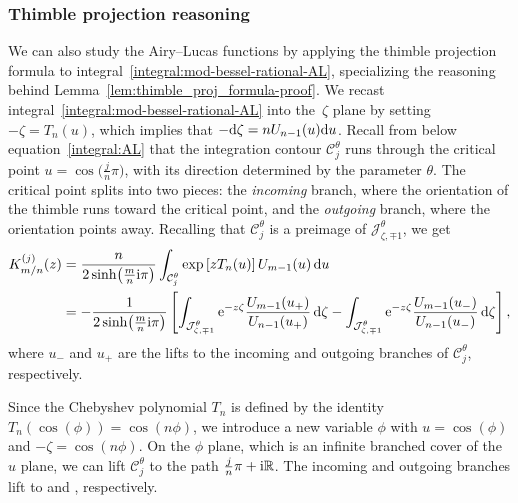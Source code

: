 \documentclass[pdftex]{sigma}
\newcommand{\R}{\mathbb{R}}
\numberwithin{equation}{section}
\begin{document}
\subsubsection{Thimble projection reasoning}\label{contour-argument-AL}
We can also study the Airy--Lucas functions by applying the thimble projection formula to integral~\eqref{integral:mod-bessel-rational-AL}, specializing the reasoning behind Lemma~\ref{lem:thimble_proj_formula-proof}. We recast integral~\eqref{integral:mod-bessel-rational-AL} into the~$\zeta$ plane by setting $-\zeta = T_n(u)$, which implies that $-{\rm d}\zeta = n U_{n-1}(u) {\rm d}u$. Recall from below equation~\eqref{integral:AL} that the integration contour $\mathcal{C}^\theta_j$ runs through the critical point $u = \cos\bigl(\frac{j}{n}\pi\bigr)$, with its direction determined by the parameter $\theta$. The critical point splits  into two pieces: the {\em incoming} branch, where the orientation of the thimble runs toward the critical point, and the {\em outgoing} branch, where the orientation points away. Recalling that $\mathcal{C}^\theta_j$ is a preimage of $\mathcal{J}^\theta_{\zeta, \mp 1}$, we get
\begin{align*}
K^{(j)}_{m/n}(z) & = \frac{n}{2 \sinh\bigl(\frac{m}{n} {\rm i}\pi\bigr)} \int_{\mathcal{C}^\theta_j} \exp\left[z T_n(u)\right] U_{m-1}(u) \,{\rm d}u \\
& = -\frac{1}{2\sinh\bigl(\frac{m}{n} {\rm i}\pi\bigr)} \left[ \int_{\mathcal{J}^\theta_{\zeta, \mp 1}} {\rm e}^{-z\zeta} \frac{U_{m-1}(u_+)}{U_{n-1}(u_+)} \,{\rm d}\zeta - \int_{\mathcal{J}^\theta_{\zeta, \mp 1}} {\rm e}^{-z\zeta} \frac{U_{m-1}(u_-)}{U_{n-1}(u_-)} \,{\rm d}\zeta \right],
\end{align*}
where $u_-$ and $u_+$ are the lifts to the incoming and outgoing branches of $\mathcal{C}^\theta_j$, respectively.

Since the Chebyshev polynomial $T_n$ is defined by the identity $T_n(\cos(\phi)) = \cos(n\phi)$, we introduce a new variable $\phi$ with $u = \cos(\phi)$ and $-\zeta = \cos(n\phi)$. On the $\phi$ plane, which is an infinite branched cover of the $u$ plane, we can lift $\mathcal{C}^\theta_j$ to the path $\frac{j}{n}\pi + {\rm i}\R$. The incoming and outgoing branches lift to \smash{$\frac{j}{n}\pi - {\rm i}[0, \infty)$} and \smash{$\frac{j}{n}\pi + {\rm i}[0, \infty)$}, respectively.
\end{document}
